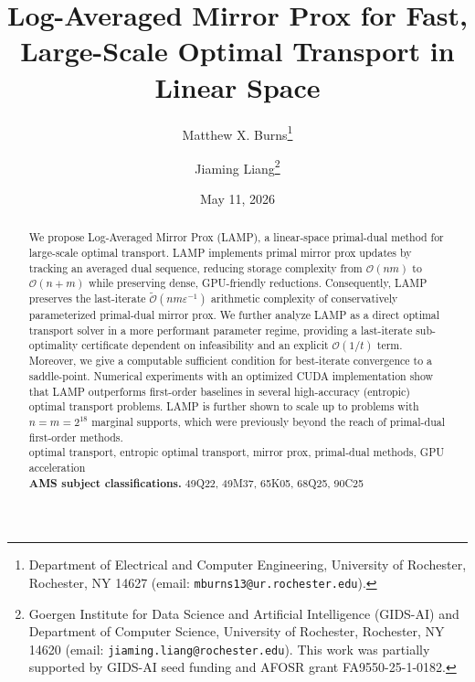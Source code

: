 \documentclass[10pt]{article}
\title{Log-Averaged Mirror Prox for Fast, Large-Scale Optimal Transport in Linear Space}
\author{
  Matthew X. Burns\thanks{
        Department of Electrical and Computer Engineering, University of Rochester, Rochester, NY 14627 (email: {\tt mburns13@ur.rochester.edu}).}
  \and
  Jiaming Liang\thanks{
        Goergen Institute for Data Science and Artificial Intelligence (GIDS-AI) and Department of Computer Science, University of Rochester, Rochester, NY 14620 (email: {\tt jiaming.liang@rochester.edu}). This work was partially supported by GIDS-AI seed funding and AFOSR grant FA9550-25-1-0182.}
}
\date{May 11, 2026}
\renewcommand{\O}{\mathcal{O}}
\newcommand{\tO}{\widetilde{\O}}
\theoremstyle{plain}
\theoremstyle{definition}
\theoremstyle{remark}
\begin{document}
\maketitle


\begin{abstract}
 We propose Log-Averaged Mirror Prox (LAMP), a linear-space primal-dual method for large-scale optimal transport.
LAMP implements primal mirror prox updates by tracking an averaged dual sequence, reducing storage complexity from $\O(nm)$ to $\O(n+m)$ while preserving dense, GPU-friendly reductions.
Consequently, LAMP preserves the last-iterate $\tO( nm\varepsilon^{-1})$ arithmetic complexity of conservatively parameterized primal-dual mirror prox. We further analyze LAMP as a direct optimal transport solver in a more performant parameter regime, providing a last-iterate sub-optimality certificate dependent on infeasibility and an explicit $\mathcal O(1/t)$ term.  Moreover, we give a computable sufficient condition for best-iterate convergence to a saddle-point.
Numerical experiments with an optimized CUDA implementation show that LAMP outperforms first-order baselines in several high-accuracy (entropic) optimal transport problems. LAMP is further shown to scale up to problems with $n=m=2^{18}$ marginal supports, which were previously beyond the reach of primal-dual first-order methods.\\


 optimal transport, entropic optimal transport, mirror prox, primal-dual methods, GPU acceleration
		\\
		{\bf AMS subject classifications.} 
		49Q22, 49M37, 65K05, 68Q25, 90C25
\end{abstract}
\end{document}
